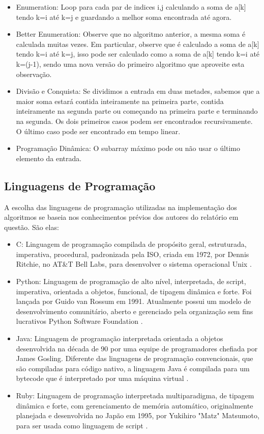 \documentclass[
	12pt,				%
	oneside,   	        %
	a4paper,			%
	english,			%
	french,				%
	spanish,			%
	brazil,				%
	]{pacotes/abntex2}
\begin{document}
 \begin{itemize}
   \item Enumeration: Loop para cada par de indices i,j calculando a soma de a[k] tendo k=i até k=j e guardando a melhor soma encontrada até agora.
   
   \item Better Enumeration: Observe que no algoritmo anterior, a mesma soma é calculada muitas vezes. Em particular, observe que é calculado a soma de a[k] tendo k=i até k=j, isso pode ser calculado como a soma de a[k] tendo k=i até k=(j-1), sendo uma nova versão do primeiro algoritmo que aproveite esta observação.
   
   \item Divisão e Conquista: Se dividimos a entrada em duas metades, sabemos que a maior soma estará contida inteiramente na primeira parte, contida inteiramente na segunda parte ou começando na primeira parte e terminando na segunda. Os dois primeiros casos podem ser encontrados recursivamente. O último caso pode ser encontrado em tempo linear.
   
   \item Programação Dinâmica: O subarray máximo pode ou não usar o último elemento da entrada.
   
 \end{itemize}

\subsection{Linguagens de Programação}
A escolha das linguagens de programação utilizadas na implementação dos algoritmos se baseia nos conhecimentos prévios dos autores do relatório em questão. São elas:
 \begin{itemize}
   \item C: Linguagem de programação compilada de propósito geral, estruturada, imperativa, procedural, padronizada pela ISO, criada em 1972, por Dennis Ritchie, no AT&T Bell Labs, para desenvolver o sistema operacional Unix \cite{c:17}.
   \item Python: Linguagem de programação de alto nível, interpretada, de script, imperativa, orientada a objetos, funcional, de tipagem dinâmica e forte. Foi lançada por Guido van Rossum em 1991. Atualmente possui um modelo de desenvolvimento comunitário, aberto e gerenciado pela organização sem fins lucrativos Python Software Foundation \cite{python:17}.
   \item Java: Linguagem de programação interpretada orientada a objetos desenvolvida na década de 90 por uma equipe de programadores chefiada por James Gosling. Diferente das linguagens de programação convencionais, que são compiladas para código nativo, a linguagem Java é compilada para um bytecode que é interpretado por uma máquina virtual \cite{java:17}.
   \item Ruby: Linguagem de programação interpretada multiparadigma, de tipagem dinâmica e forte, com gerenciamento de memória automático, originalmente planejada e desenvolvida no Japão em 1995, por Yukihiro "Matz" Matsumoto, para ser usada como linguagem de script \cite{ruby:17}.
 \end{itemize}
\end{document}

